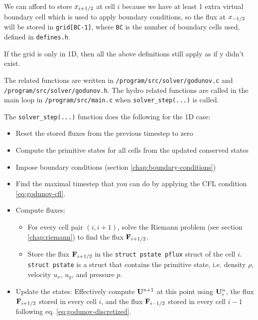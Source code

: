 We can afford to store $x_{i+1/2}$ at cell $i$ because we have at least 1 extra virtual boundary cell which is used to apply boundary conditions, so the flux at $x_{-1/2}$ will be stored in \verb|grid[BC-1]|, where \texttt{BC} is the number of boundary cells used, defined in \texttt{defines.h}.
 

If the grid is only in 1D, then all the above definitions still apply as if y didn't exist.



The related functions are written in \texttt{/program/src/solver/godunov.c} and \texttt{/program/src/solver/godunov.h}.
The hydro related functions are called in the main loop in \texttt{/program/src/main.c} when \verb|solver_step(...)| is called.

The \verb|solver_step(...)| function does the following for the 1D case:
\begin{itemize}
	\item 	Reset the stored fluxes from the previous timestep to zero
	\item 	Compute the primitive states for all cells from the updated conserved states
	\item 	Impose boundary conditions (section \ref{chap:boundary-conditions})
	\item 	Find the maximal timestep that you can do by applying the CFL condition \ref{eq:godunov-cfl}.
	\item 	Compute fluxes:
	\begin{itemize}
		\item 	For every cell pair $(i, i+1)$, solve the Riemann problem (see section \ref{chap:riemann}) to find the flux $\mathbf{F}_{i+1/2}$.
		\item 	Store the flux $\mathbf{F}_{i+1/2}$ in the \texttt{struct pstate pflux} struct of the cell $i$.
				\texttt{struct pstate} is a struct that contains the primitive state, i.e. density $\rho$, velocity $u_x$, $u_y$, and pressure $p$.
	\end{itemize}
	\item 	Update the states: Effectively compute $\mathbf{U}^{n+1}$ at this point using $\mathbf{U}_i^n$, the flux $\mathbf{F}_{i+1/2}$ stored in every cell $i$, and the flux $\mathbf{F}_{i-1/2}$ stored in every cell $i-1$ following eq. \ref{eq:godunov-discretized}.
\end{itemize}

























